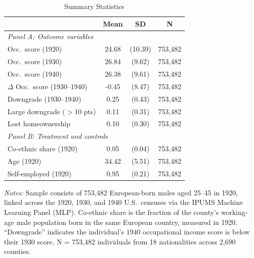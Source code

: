 \begin{table}[t]
\centering
\caption{Summary Statistics}
\label{tab:summary}
\begin{tabular}{lccc}
\hline\hline
 & Mean & SD & N \\
\hline
\multicolumn{4}{l}{\textit{Panel A: Outcome variables}} \\[3pt]
Occ.\ score (1920) & 24.68 & (10.39) & 753,482 \\
Occ.\ score (1930) & 26.84 & (9.62) & 753,482 \\
Occ.\ score (1940) & 26.38 & (9.61) & 753,482 \\
$\Delta$ Occ.\ score (1930--1940) & -0.45 & (8.47) & 753,482 \\
Downgrade (1930--1940) & 0.25 & (0.43) & 753,482 \\
Large downgrade ($>$10 pts) & 0.11 & (0.31) & 753,482 \\
Lost homeownership & 0.10 & (0.30) & 753,482 \\
\hline
\multicolumn{4}{l}{\textit{Panel B: Treatment and controls}} \\[3pt]
Co-ethnic share (1920) & 0.05 & (0.04) & 753,482 \\
Age (1920) & 34.42 & (5.51) & 753,482 \\
Self-employed (1920) & 0.95 & (0.21) & 753,482 \\
\hline\hline
\end{tabular}
\begin{minipage}{0.92\textwidth}\footnotesize
\textit{Notes:} Sample consists of 753,482 European-born males aged 25--45 in 1920, linked across the 1920, 1930, and 1940 U.S.\ censuses via the IPUMS Machine Learning Panel (MLP). Co-ethnic share is the fraction of the county's working-age male population born in the same European country, measured in 1920. ``Downgrade'' indicates the individual's 1940 occupational income score is below their 1930 score. N = 753,482 individuals from 18 nationalities across 2,690 counties.
\end{minipage}
\end{table}
